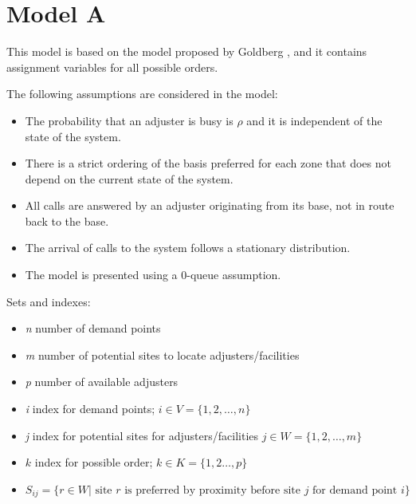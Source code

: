 
\section{Model A}

This model is based
on the model
proposed by Goldberg \cite{goldberg1990validating},
and it contains assignment variables
for all possible orders.

The following assumptions are considered in the model:
\begin{itemize}
\item The probability that an adjuster is busy
  is $\rho$ and it is independent of the state of the system.
\item There is a strict ordering of the basis preferred for each zone
  that does not depend
  on the current state of the system.
\item All calls are answered
  by an adjuster originating from its base,
  not in route back to the base.
\item The arrival of calls to the system
  follows a stationary distribution.
\item The model is presented
  using a 0-queue assumption.
\end{itemize}

Sets and indexes:
\begin{itemize}
\item \textit{n} number of demand points
\item \textit{m} number of potential sites to locate adjusters/facilities
\item \textit{p} number of available adjusters
\item \textit{i} index for demand points;
  $i \in V = \{1,2,\ldots,n\}$ 
\item \textit{j} index for potential sites for adjusters/facilities
  $j \in W = \{1,2,\ldots,m\}$
\item $k$ index for possible order;
  $k \in K = \{1,2\ldots,p\}$
\item $S_{ij} = \{
  r \in W | \mbox{ site } r \mbox{ is preferred by proximity before site } j
  \mbox{ for demand point } i
  \}$
\end{itemize}

